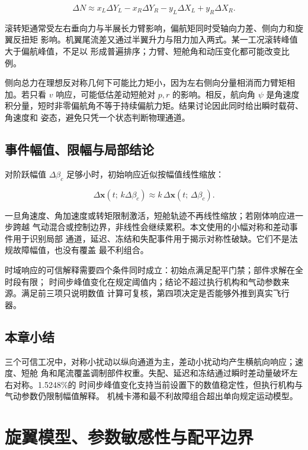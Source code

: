 \documentclass[UTF8,12pt,oneside,openany,fontset=windows]{ctexbook}
\begin{document}
\begin{equation}
\Delta N\approx x_L\Delta Y_L-x_R\Delta Y_R
-y_L\Delta X_L+y_R\Delta X_R.
\end{equation}

滚转矩通常受左右垂向力与半展长力臂影响，偏航矩同时受轴向力差、侧向力和旋翼反扭矩 影响。机翼尾流差又通过半翼升力与阻力加入两式。某一工况滚转峰值大于偏航峰值，不足以 形成普遍排序；力臂、短舱角和动压变化都可能改变比例。

侧向总力在理想反对称几何下可能比力矩小，因为左右侧向分量相消而力臂矩相加。若只看 \(v\) 响应，可能低估差动短舱对 \(p,r\) 的影响。相反，航向角 \(\psi\) 是角速度 积分量，短时非零偏航角不等于持续偏航力矩。结果讨论因此同时给出瞬时载荷、角速度和 姿态，避免只凭一个状态判断物理通道。

\section{事件幅值、限幅与局部结论}

对阶跃幅值 \(\Delta\beta_c\) 足够小时，初始响应近似按幅值线性缩放：

\begin{equation}
\Delta\mathbf x(t;\,k\Delta\beta_c)\approx
k\,\Delta\mathbf x(t;\,\Delta\beta_c).
\end{equation}

一旦角速度、角加速度或转矩限制激活，短舱轨迹不再线性缩放；若刚体响应进一步跨越 气动混合或控制边界，非线性会继续累积。本文使用的小幅对称和差动事件用于识别局部 通道，延迟、冻结和失配事件用于揭示对称性破缺。它们不是法规故障幅值，也没有覆盖 最不利组合。

时域响应的可信解释需要四个条件同时成立：初始点满足配平门禁；部件求解在全时段有限； 时间步峰值变化在规定阈值内；结论不超过执行机构和气动参数来源。满足前三项只说明数值 计算可复核，第四项决定是否能够外推到真实飞行器。

\section{本章小结}

三个可信工况中，对称小扰动以纵向通道为主，差动小扰动均产生横航向响应；速度、短舱 角和尾流覆盖调制部件权重。失配、延迟和冻结通过瞬时差动量破坏左右对称。1.5248\%的 时间步峰值变化支持当前设置下的数值稳定性，但执行机构与气动参数仍限制幅值解释。 机械卡滞和最不利故障组合超出单向规定运动模型。

\chapter{旋翼模型、参数敏感性与配平边界}
\end{document}
